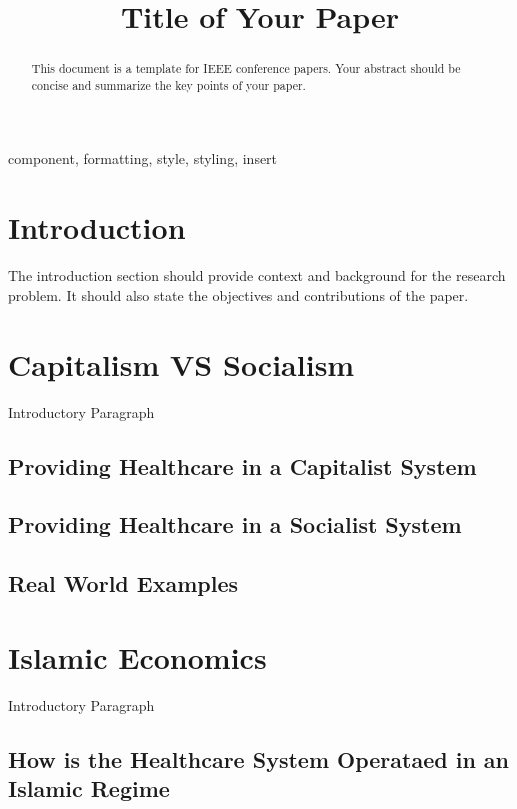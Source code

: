 \documentclass[conference]{IEEEtran}
\begin{document}
\title{Title of Your Paper}

\author{
}

\maketitle

\begin{abstract}
This document is a template for IEEE conference papers. Your abstract should be concise and summarize the key points of your paper.
\end{abstract}

\begin{IEEEkeywords}
component, formatting, style, styling, insert
\end{IEEEkeywords}

\section{Introduction}
The introduction section should provide context and background for the research problem. It should also state the objectives and contributions of the paper.

\section{Capitalism VS Socialism}
Introductory Paragraph
\subsection{Providing Healthcare in a Capitalist System}
\subsection{Providing Healthcare in a Socialist System}
\subsection{Real World Examples}

\section{Islamic Economics}
Introductory Paragraph
\subsection{How is the Healthcare System Operataed in an Islamic Regime}
\end{document}
